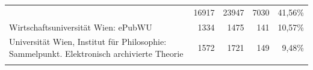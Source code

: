 \documentclass[a4paper,
fontsize=11pt,
oneside,
numbers=noperiodatend,
parskip=half-,
bibliography=totoc,
final
]{scrartcl}
\begin{document}
\begin{longtable}[c]{@{}lrrrr@{}}
\begin{minipage}[t]{0.31\columnwidth}
\strut\end{minipage} &
\begin{minipage}[t]{0.14\columnwidth}\raggedleft\strut
16917
\strut\end{minipage} &
\begin{minipage}[t]{0.15\columnwidth}\raggedleft\strut
23947
\strut\end{minipage} &
\begin{minipage}[t]{0.14\columnwidth}\raggedleft\strut
7030
\strut\end{minipage} &
\begin{minipage}[t]{0.14\columnwidth}\raggedleft\strut
41,56\%
\strut\end{minipage}\tabularnewline
\begin{minipage}[t]{0.31\columnwidth}\raggedright\strut
Wirtschaftsuniversität Wien: ePubWU
\strut\end{minipage} &
\begin{minipage}[t]{0.14\columnwidth}\raggedleft\strut
1334
\strut\end{minipage} &
\begin{minipage}[t]{0.15\columnwidth}\raggedleft\strut
1475
\strut\end{minipage} &
\begin{minipage}[t]{0.14\columnwidth}\raggedleft\strut
141
\strut\end{minipage} &
\begin{minipage}[t]{0.14\columnwidth}\raggedleft\strut
10,57\%
\strut\end{minipage}\tabularnewline
\begin{minipage}[t]{0.31\columnwidth}\raggedright\strut
Universität Wien, Institut für Philosophie: Sammelpunkt. Elektronisch
archivierte Theorie
\strut\end{minipage} &
\begin{minipage}[t]{0.14\columnwidth}\raggedleft\strut
1572
\strut\end{minipage} &
\begin{minipage}[t]{0.15\columnwidth}\raggedleft\strut
1721
\strut\end{minipage} &
\begin{minipage}[t]{0.14\columnwidth}\raggedleft\strut
149
\strut\end{minipage} &
\begin{minipage}[t]{0.14\columnwidth}\raggedleft\strut
9,48\%
\strut\end{minipage}\tabularnewline
\begin{minipage}[t]{0.31\columnwidth}\raggedright\strut

\end{minipage}
\end{longtable}
\end{document}
